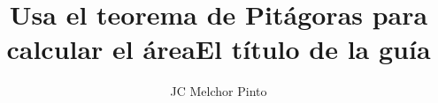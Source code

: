 \documentclass[12pt,addpoints,answers]{guia}
\title{Usa el teorema de Pitágoras para calcular el área}
\title{El título de la guía}
\author{JC Melchor Pinto}
\begin{document}
\pagestyle{headandfoot}

\INFO
\printanswers
\vspace{-0.5cm}
\begin{multicols}{2}
    
    
    
    \columnbreak
    
    
\end{multicols}
\begin{questions}
    \questionboxed[10]{}
    \questionboxed[10]{}
    \questionboxed[10]{}
    \questionboxed[10]{}
    \questionboxed[10]{}
    \questionboxed[10]{}
    \questionboxed[10]{}
    \questionboxed[10]{}
    \questionboxed[10]{}
    \questionboxed[10]{}
\end{questions}
\end{document}
